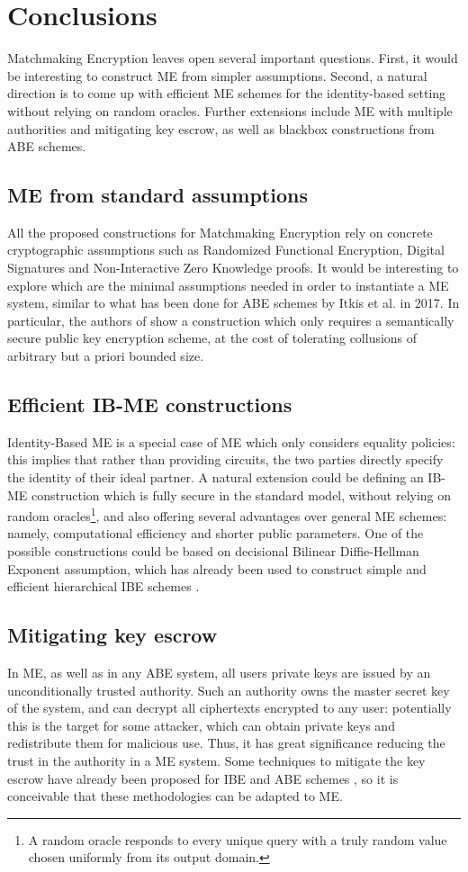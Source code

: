 \chapter{Conclusions}
Matchmaking Encryption leaves open several important questions.
First, it would be interesting to construct ME from simpler assumptions.
Second, a natural direction is to come up with efficient ME schemes for the identity-based setting without relying on random oracles.
Further extensions include ME with multiple authorities and mitigating key escrow, as well as blackbox constructions from ABE schemes.

\section{ME from standard assumptions}
All the proposed constructions for Matchmaking Encryption rely on concrete cryptographic assumptions such as Randomized Functional Encryption, Digital Signatures and Non-Interactive Zero Knowledge proofs.
It would be interesting to explore which are the minimal assumptions needed in order to instantiate a ME system, similar to what has been done for ABE schemes by Itkis et al. \cite{Itkis} in 2017.
In particular, the authors of \cite{Itkis} show a construction which only requires a semantically secure public key encryption scheme, at the cost of tolerating collusions of arbitrary but a priori bounded size.

\section{Efficient IB-ME constructions}
Identity-Based ME is a special case of ME which only considers equality policies: this implies that rather than providing circuits, the two parties directly specify the identity of their ideal partner.
A natural extension could be defining an IB-ME construction which is fully secure in the standard model, without relying on random oracles\footnote{A random oracle responds to every unique query with a truly random value chosen uniformly from its output domain.}, and also offering several advantages over general ME schemes: namely, computational efficiency and shorter public parameters.
One of the possible constructions could be based on decisional Bilinear Diffie-Hellman Exponent assumption, which has already been used to construct simple and efficient hierarchical IBE schemes \cite{Gentry}.

\section{Mitigating key escrow}
In ME, as well as in any ABE system, all users private keys are issued by an unconditionally trusted authority.
Such an authority owns the master secret key of the system, and can decrypt all ciphertexts encrypted to any user: potentially this is the target for some attacker, which can obtain private keys and redistribute them for malicious use.
Thus, it has great significance reducing the trust in the authority in a ME system.
Some techniques to mitigate the key escrow have already been proposed for IBE and ABE schemes \cite{Wang}, so it is conceivable that these methodologies can be adapted to ME.


